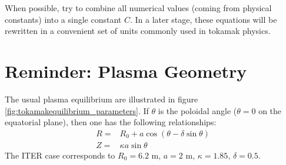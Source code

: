 When possible, try to combine all numerical values (coming from physical constants) into a single constant $C$. In a later stage, these equations will be rewritten in a convenient set of units commonly used in tokamak physics.


\section{Reminder: Plasma Geometry}
The usual plasma equilibrium are illustrated in figure \ref{fig:tokamakequilibrium_parameters}. If $\theta$ is the poloidal angle ($\theta=0$ on the equatorial plane), then one has the following relationships:
\begin{align}
R =& R_0 + a \cos \left(\theta - \delta \sin\theta \right) \\
Z =& \kappa a \sin \theta
\end{align}
The ITER case corresponds to $R_0=6.2$ m, $a=2$ m, $\kappa=1.85$, $\delta=0.5$. 

